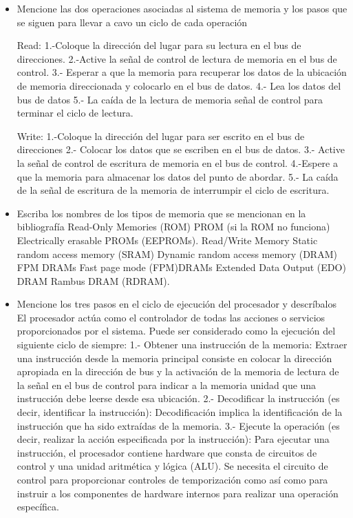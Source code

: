 \begin{itemize}
		\item Mencione las dos operaciones asociadas al sistema de memoria y los pasos que se siguen para llevar a cavo un ciclo de cada operación
		
		Read:
		1.-Coloque la dirección del lugar para su lectura en el bus de direcciones.
		2.-Active la señal de control de lectura de memoria en el bus de control.
		3.- Esperar a que la memoria para recuperar los datos de la ubicación de memoria direccionada y colocarlo en el bus de datos.
		4.- Lea los datos del bus de datos
		5.- La caída de la lectura de memoria señal de control para terminar el ciclo de lectura.
		
		Write:
		1.-Coloque la dirección del lugar para ser escrito en el bus de direcciones
		2.- Colocar los datos que se escriben en el bus de datos.
		3.- Active la señal de control de escritura de memoria en el bus de control.
		4.-Espere a que la memoria para almacenar los datos del punto de abordar.
		5.- La caída de la señal de escritura de la memoria de interrumpir el ciclo de escritura.
		
		\item Escriba los nombres de los tipos de memoria que se mencionan en la bibliografía
		Read-Only Memories (ROM)
		PROM (si la ROM no funciona)
		Electrically erasable PROMs (EEPROMs).
		Read/Write Memory
		 Static random access memory (SRAM)
		  Dynamic random access memory (DRAM)
		  FPM DRAMs Fast page mode (FPM)DRAMs
		  Extended Data Output (EDO) DRAM 
		  Rambus DRAM (RDRAM).
		
		\item Mencione los tres pasos en el ciclo de ejecución del procesador y descríbalos
		El procesador actúa como el controlador de todas las acciones o servicios proporcionados por el sistema. Puede ser considerado como la ejecución del siguiente ciclo de siempre:
		1.- Obtener una instrucción de la memoria:
		Extraer una instrucción desde la memoria principal consiste en colocar la dirección apropiada en la dirección de bus y la activación de la memoria de lectura de la señal en el bus de control para indicar a la memoria unidad que una instrucción debe leerse desde esa ubicación.
		2.- Decodificar la instrucción (es decir, identificar la instrucción):
		Decodificación implica la identificación de la instrucción que ha sido extraídas de la memoria.
		3.- Ejecute la operación (es decir, realizar la acción especificada por la instrucción):
		Para ejecutar una instrucción, el procesador contiene hardware que consta de circuitos de control y una unidad aritmética y lógica (ALU). Se necesita el circuito de control para proporcionar controles de temporización como así como para instruir a los componentes de hardware internos para realizar una operación específica.
		

\end{itemize}
